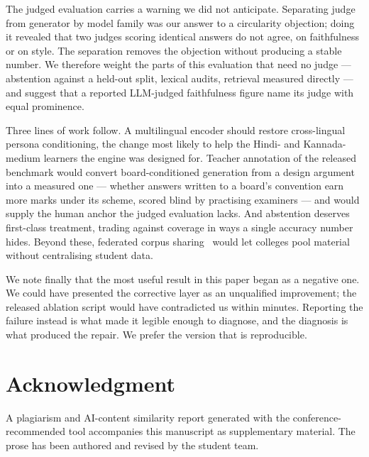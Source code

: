 \documentclass[conference]{IEEEtran}
\begin{document}
The judged evaluation carries a warning we did not anticipate. Separating judge
from generator by model family was our answer to a circularity objection; doing
it revealed that two judges scoring identical answers do not agree, on
faithfulness or on style. The separation removes the objection without
producing a stable number. We therefore weight the parts of this evaluation
that need no judge --- abstention against a held-out split, lexical audits,
retrieval measured directly --- and suggest that a reported LLM-judged
faithfulness figure name its judge with equal prominence.

Three lines of work follow. A multilingual encoder should restore
cross-lingual persona conditioning, the change most likely to help the Hindi-
and Kannada-medium learners the engine was designed for. Teacher annotation of
the released benchmark would convert board-conditioned generation from a design
argument into a measured one --- whether answers written to a board's
convention earn more marks under its scheme, scored blind by practising
examiners --- and would supply the human anchor the judged evaluation lacks.
And abstention deserves first-class treatment, trading against coverage in ways
a single accuracy number hides. Beyond these, federated corpus
sharing~\cite{fajardo2025} would let colleges pool material without
centralising student data.

We note finally that the most useful result in this paper began as a negative
one. We could have presented the corrective layer as an unqualified improvement;
the released ablation script would have contradicted us within minutes.
Reporting the failure instead is what made it legible enough to diagnose, and
the diagnosis is what produced the repair. We prefer the version that is
reproducible.

\section*{Acknowledgment}
A plagiarism and AI-content similarity report generated with the
conference-recommended tool accompanies this manuscript as supplementary
material. The prose has been authored and revised by the student team.
\end{document}
